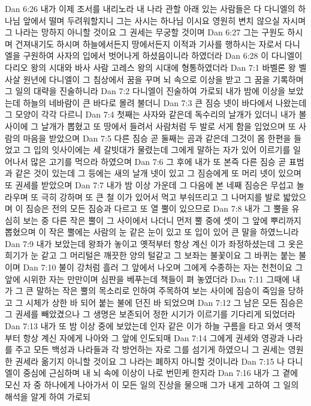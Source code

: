 Dan 6:26  내가 이제 조서를 내리노라 내 나라 관할 아래 있는 사람들은 다 다니엘의 하나님 앞에서 떨며 두려워할지니 그는 사시는 하나님 이시요 영원히 변치 않으실 자시며 그 나라는 망하지 아니할 것이요 그 권세는 무궁할 것이며
Dan 6:27  그는 구원도 하시며 건져내기도 하시며 하늘에서든지 땅에서든지 이적과 기사를 행하시는 자로서 다니엘을 구원하여 사자의 입에서 벗어나게 하셨음이니라 하였더라
Dan 6:28  이 다니엘이 다리오 왕의 시대와 바사 사람 고레스 왕의 시대에 형통하였더라
Dan 7:1  바벨론 왕 벨사살 원년에 다니엘이 그 침상에서 꿈을 꾸며 뇌 속으로 이상을 받고 그 꿈을 기록하며 그 일의 대략을 진술하니라
Dan 7:2  다니엘이 진술하여 가로되 내가 밤에 이상을 보았는데 하늘의 네바람이 큰 바다로 몰려 불더니
Dan 7:3  큰 짐승 넷이 바다에서 나왔는데 그 모양이 각각 다르니
Dan 7:4  첫째는 사자와 같은데 독수리의 날개가 있더니 내가 볼 사이에 그 날개가 뽑혔고 또 땅에서 들려서 사람처럼 두 발로 서게 함을 입었으며 또 사람의 마음을 받았으며
Dan 7:5  다른 짐승 곧 둘째는 곰과 같은데 그것이 몸 한편을 들었고 그 입의 잇사이에는 세 갈빗대가 물렸는데 그에게 말하는 자가 있어 이르기를 일어나서 많은 고기를 먹으라 하였으며
Dan 7:6  그 후에 내가 또 본즉 다른 짐승 곧 표범과 같은 것이 있는데 그 등에는 새의 날개 넷이 있고 그 짐승에게 또 머리 넷이 있으며 또 권세를 받았으며
Dan 7:7  내가 밤 이상 가운데 그 다음에 본 네째 짐승은 무섭고 놀라우며 또 극히 강하며 또 큰 철 이가 있어서 먹고 부숴뜨리고 그 나머지를 발로 밟았으며 이 짐승은 전의 모든 짐승과 다르고 또 열 뿔이 있으므로
Dan 7:8  내가 그 뿔을 유심히 보는 중 다른 작은 뿔이 그 사이에서 나더니 먼저 뿔 중에 셋이 그 앞에 뿌리까지 뽑혔으며 이 작은 뿔에는 사람의 눈 같은 눈이 있고 또 입이 있어 큰 말을 하였느니라
Dan 7:9  내가 보았는데 왕좌가 놓이고 옛적부터 항상 계신 이가 좌정하셨는데 그 옷은 희기가 눈 같고 그 머리털은 깨끗한 양의 털같고 그 보좌는 불꽃이요 그 바퀴는 붙는 불이며
Dan 7:10  불이 강처럼 흘러 그 앞에서 나오며 그에게 수종하는 자는 천천이요 그 앞에 시위한 자는 만만이며 심판을 베푸는데 책들이 펴 놓였더라
Dan 7:11  그때에 내가 그 큰 말하는 작은 뿔의 목소리로 인하여 주목하여 보는 사이에 짐승이 죽임을 당하고 그 시체가 상한 바 되어 붙는 불에 던진 바 되었으며
Dan 7:12  그 남은 모든 짐승은 그 권세를 빼았겼으나 그 생명은 보존되어 정한 시기가 이르기를 기다리게 되었더라
Dan 7:13  내가 또 밤 이상 중에 보았는데 인자 같은 이가 하늘 구름을 타고 와서 옛적부터 항상 계신 자에게 나아와 그 앞에 인도되매
Dan 7:14  그에게 권세와 영광과 나라를 주고 모든 백성과 나라들과 각 방언하는 자로 그를 섬기게 하였으니 그 권세는 영원한 권세라 옮기지 아니할 것이요 그 나라는 폐하지 아니할 것이니라
Dan 7:15  나 다니엘이 중심에 근심하며 내 뇌 속에 이상이 나로 번민케 한지라
Dan 7:16  내가 그 곁에 모신 자 중 하나에게 나아가서 이 모든 일의 진상을 물으매 그가 내게 고하여 그 일의 해석을 알게 하여 가로되
